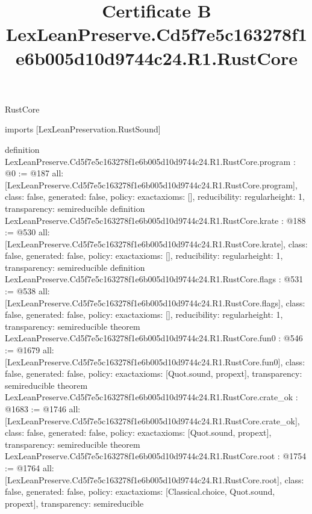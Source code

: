 \begin{lexlean}{RustCore}
\title{Certificate B LexLeanPreserve.Cd5f7e5c163278f1e6b005d10d9744c24.R1.RustCore}
\begin{coremodule}
imports [LexLeanPreservation.RustSound]

definition LexLeanPreserve.Cd5f7e5c163278f1e6b005d10d9744c24.R1.RustCore.program : @0 := @187 {
  all: [LexLeanPreserve.Cd5f7e5c163278f1e6b005d10d9744c24.R1.RustCore.program],
  class: false,
  generated: false,
  policy: exact{axioms: []},
  reducibility: regular{height: 1},
  transparency: semireducible
}
definition LexLeanPreserve.Cd5f7e5c163278f1e6b005d10d9744c24.R1.RustCore.krate : @188 := @530 {
  all: [LexLeanPreserve.Cd5f7e5c163278f1e6b005d10d9744c24.R1.RustCore.krate],
  class: false,
  generated: false,
  policy: exact{axioms: []},
  reducibility: regular{height: 1},
  transparency: semireducible
}
definition LexLeanPreserve.Cd5f7e5c163278f1e6b005d10d9744c24.R1.RustCore.flags : @531 := @538 {
  all: [LexLeanPreserve.Cd5f7e5c163278f1e6b005d10d9744c24.R1.RustCore.flags],
  class: false,
  generated: false,
  policy: exact{axioms: []},
  reducibility: regular{height: 1},
  transparency: semireducible
}
theorem LexLeanPreserve.Cd5f7e5c163278f1e6b005d10d9744c24.R1.RustCore.fun0 : @546 := @1679 {
  all: [LexLeanPreserve.Cd5f7e5c163278f1e6b005d10d9744c24.R1.RustCore.fun0],
  class: false,
  generated: false,
  policy: exact{axioms: [Quot.sound, propext]},
  transparency: semireducible
}
theorem LexLeanPreserve.Cd5f7e5c163278f1e6b005d10d9744c24.R1.RustCore.crate_ok : @1683 := @1746 {
  all: [LexLeanPreserve.Cd5f7e5c163278f1e6b005d10d9744c24.R1.RustCore.crate_ok],
  class: false,
  generated: false,
  policy: exact{axioms: [Quot.sound, propext]},
  transparency: semireducible
}
theorem LexLeanPreserve.Cd5f7e5c163278f1e6b005d10d9744c24.R1.RustCore.root : @1754 := @1764 {
  all: [LexLeanPreserve.Cd5f7e5c163278f1e6b005d10d9744c24.R1.RustCore.root],
  class: false,
  generated: false,
  policy: exact{axioms: [Classical.choice, Quot.sound, propext]},
  transparency: semireducible
}


\end{coremodule}
\end{lexlean}
